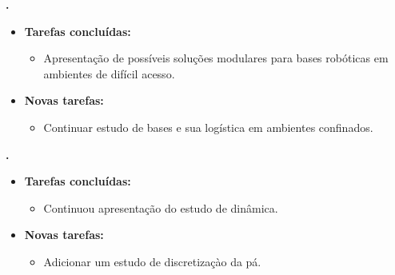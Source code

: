 					
			
   \textbf{.} 
	\begin{itemize}
		\item \textbf{Tarefas concluídas:}
			\begin{itemize}  
			  \item Apresentação de possíveis soluções modulares para bases robóticas em
			  ambientes de difícil acesso.
			\end{itemize}
		
		\item \textbf{Novas tarefas:}
			\begin{itemize} 
				\item Continuar estudo de bases e sua logística em ambientes confinados.
			\end{itemize}
	\end{itemize}

	  \textbf{\renan.} 
	\begin{itemize}
		\item \textbf{Tarefas concluídas:}
			\begin{itemize}    
				\item Continuou apresentação do estudo de dinâmica.
			\end{itemize}
		
		\item \textbf{Novas tarefas:}
			\begin{itemize} 
			    \item Adicionar um estudo de discretizaçào da pá.
			\end{itemize}
	\end{itemize}	
	
